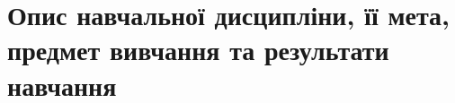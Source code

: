 \documentclass{Syllabus}
\begin{document}
\printhead


\bluetableprint


\section{Опис навчальної дисципліни, її мета, предмет вивчання та результати навчання}



\end{document}
